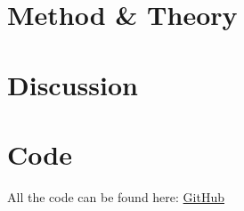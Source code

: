 \documentclass[a4paper,11pt]{article}
\newenvironment{code}{\captionsetup{type=listing}}{}
\begin{document}
\section{Method \& Theory}
\label{method}

\section{Discussion}


\newpage
\FloatBarrier
\section*{Code}
All the code can be found here: \href{https://github.com/adrian-jonsson-sjoedin/ID1021-AlgoData/tree/main/Tasks/Queues/src}{GitHub}

\begin{code}
    \label{code:queueNoLast}
    \begin{verbatim}

\end{verbatim}
\end{code}

\begin{code}
    \label{code:queue}
    \begin{verbatim}

    \end{verbatim}
\end{code}

\begin{code}
    \label{code:iterator}
    \begin{verbatim}

    \end{verbatim}
\end{code}

\begin{code}
    \label{code:arrayAdd}
    \begin{verbatim}

    \end{verbatim}
\end{code}

\begin{code}
    \label{code:arrayDequeue}
    \begin{verbatim}

    \end{verbatim}
\end{code}

\begin{code}
    \label{code:resize}
    \begin{verbatim}

    \end{verbatim}
\end{code}
\end{document}
